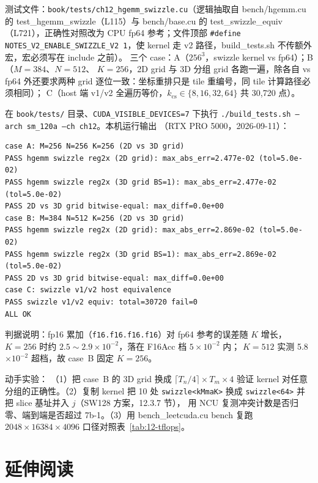 测试文件：\texttt{book/\allowbreak{}tests/\allowbreak{}ch12\_\allowbreak{}hgemm\_\allowbreak{}swizzle.cu}（逻辑抽取自 bench/hgemm.cu
的 test\_hgemm\_swizzle（L115）与 bench/base.cu 的 test\_swizzle\_equiv（L721），正确性对照改为
CPU fp64 参考；文件顶部 \texttt{\#define NOTES\_\allowbreak{}V2\_\allowbreak{}ENABLE\_\allowbreak{}SWIZZLE\_\allowbreak{}V2 1}，使
kernel 走 v2 路径，build\_tests.sh 不传额外宏，宏必须写在 include 之前）。
三个 case：A（$256^3$，swizzle kernel vs fp64）；B（$M{=}384$、$N{=}512$、
$K{=}256$，2D grid 与 3D 分组 grid 各跑一遍，除各自 vs fp64 外还要求两种 grid
逐位一致：坐标重排只是 tile 重编号，同 tile 计算路径必须相同）；
C（host 端 v1/v2 全遍历等价，$k_{\mathrm{cs}}\in\{8,16,32,64\}$ 共 30{,}720 点）。

在 \texttt{book/tests/} 目录、\texttt{CUDA\_\allowbreak{}VISIBLE\_\allowbreak{}DEVICES=\allowbreak{}7} 下执行
\texttt{.\allowbreak{}/\allowbreak{}build\_\allowbreak{}tests.\allowbreak{}sh --arch sm\_\allowbreak{}120a --ch ch12}。本机运行输出
（RTX PRO 5000，2026-09-11）：

\begin{lstlisting}[style=console]
case A: M=256 N=256 K=256 (2D vs 3D grid)
PASS hgemm swizzle reg2x (2D grid): max_abs_err=2.477e-02 (tol=5.0e-02)
PASS hgemm swizzle reg2x (3D grid BS=1): max_abs_err=2.477e-02 (tol=5.0e-02)
PASS 2D vs 3D grid bitwise-equal: max_diff=0.0e+00
case B: M=384 N=512 K=256 (2D vs 3D grid)
PASS hgemm swizzle reg2x (2D grid): max_abs_err=2.869e-02 (tol=5.0e-02)
PASS hgemm swizzle reg2x (3D grid BS=1): max_abs_err=2.869e-02 (tol=5.0e-02)
PASS 2D vs 3D grid bitwise-equal: max_diff=0.0e+00
case C: swizzle v1/v2 host equivalence
PASS swizzle v1/v2 equiv: total=30720 fail=0
ALL OK
\end{lstlisting}

判据说明：fp16 累加（\texttt{f16.f16.f16.f16}）对 fp64 参考的误差随 $K$ 增长，
$K{=}256$ 时约 $2.5{\sim}2.9\times10^{-2}$，落在 F16Acc 档 $5\times10^{-2}$ 内；
$K{=}512$ 实测 5.8$\times10^{-2}$ 超档，故 case~B 固定 $K{=}256$。

动手实验：
（1）把 case~B 的 3D grid 换成 $\lceil T_n/4\rceil\times T_m\times 4$ 验证
kernel 对任意分组的正确性。（2）复制 kernel 把 10 处 \texttt{swizzle\allowbreak{}<k\allowbreak{}Mma\allowbreak{}K>}
换成 \texttt{swizzle<64>} 并把 slice 基址并入 $j$（SW128 方案，12.3.7 节），
用 NCU 复测冲突计数是否归零、端到端是否超过 7b-1。（3）用
bench\_leetcuda.cu bench 复跑 $2048\times16384\times4096$ 口径对照表~\ref{tab:12-tflops}。

\section*{延伸阅读}

